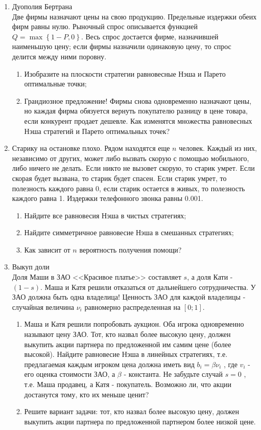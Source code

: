 \documentclass[pdftex,12pt,a4paper]{article}
\begin{document}
\begin{enumerate}
\item Дуополия Бертрана \\
Две фирмы назначают цены на свою продукцию. Предельные издержки обеих фирм равны нулю. Рыночный спрос описывается функцией $Q = \max \left\{ {1 - P,0} \right\}$. Весь спрос достается фирме, назначившей наименьшую цену; если фирмы назначили одинаковую цену, то спрос делится между ними поровну.
\begin{enumerate}
\item Изобразите на плоскости стратегии равновесные Нэша и Парето оптимальные точки;
\item Грандиозное предложение! Фирмы снова одновременно назначают цены, но каждая фирма обязуется вернуть покупателю разницу в цене товара, если конкурент продает дешевле. Как изменятся множества равновесных Нэша стратегий и Парето оптимальных точек?
\end{enumerate}

\item Старику на остановке плохо. Рядом находятся еще $n$  человек. Каждый из них, независимо от других, может либо вызвать скорую с помощью мобильного, либо ничего не делать. Если никто не вызовет скорую, то старик умрет. Если скорая будет вызвана, то старик будет спасен. Если старик умрет, то полезность каждого равна 0, если старик остается в живых, то полезность каждого равна 1. Издержки телефонного звонка равны 0.001.
\begin{enumerate}
\item Найдите все равновесия Нэша в чистых стратегиях;
\item Найдите симметричное равновесие Нэша в смешанных стратегиях;
\item Как зависит от  $n$  вероятность получения помощи?
\end{enumerate}

\item Выкуп доли\\
Доля Маши в ЗАО <<Красивое платье>> составляет  $s$, а доля Кати -  $\left(1-s\right)$. Маша и Катя решили отказаться от дальнейшего сотрудничества. У ЗАО должна быть одна владелица! 
Ценность ЗАО для каждой владелицы - случайная величина  $\nu _{i} $  равномерно распределенная на  $\left[0;1\right]$.
\begin{enumerate}
\item Маша и Катя решили попробовать аукцион. Оба игрока одновременно называют цену ЗАО. Тот, кто назвал более высокую цену, должен выкупить акции партнера по предложенной им самим цене (более высокой). Найдите равновесие Нэша в линейных стратегиях, т.е. предлагаемая каждым игроком цена должна иметь вид  $b_{i} =\beta \nu _{i} $ , где  $v_{i} $  - его оценка стоимости ЗАО, а    $\beta $  - константа. Не забудьте случай  $s=0$ , т.е. Маша продавец, а Катя - покупатель. Возможно ли, что акции достанутся тому, кто их меньше ценит?
\item Решите вариант задачи: тот, кто назвал более высокую цену, должен выкупить акции партнера по предложенной партнером более низкой цене. 
\end{enumerate}


\end{enumerate}
\end{document}
